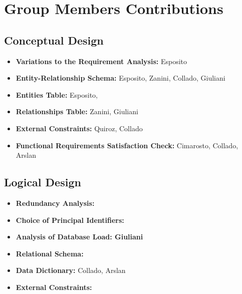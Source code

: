 \section{Group Members Contributions}


\subsection{Conceptual Design}
\begin{itemize}
	\item \textbf{Variations to the Requirement Analysis:} Esposito
	\item \textbf{Entity-Relationship Schema:} Esposito, Zanini, Collado, Giuliani 
	\item \textbf{Entities Table:} Esposito, 
	\item \textbf{Relationships Table:} Zanini, Giuliani
	\item \textbf{External Constraints:} Quiroz, Collado
	\item \textbf{Functional Requirements Satisfaction Check:} Cimarosto, Collado, Arslan
\end{itemize}

\subsection{Logical Design}
\begin{itemize}
	\item \textbf{Redundancy Analysis:} 
	\item \textbf{Choice of Principal Identifiers:}
	\item \textbf{Analysis of Database Load: Giuliani}
	\item \textbf{Relational Schema:}
	\item \textbf{Data Dictionary:} Collado, Arslan
	\item \textbf{External Constraints:}
\end{itemize}	